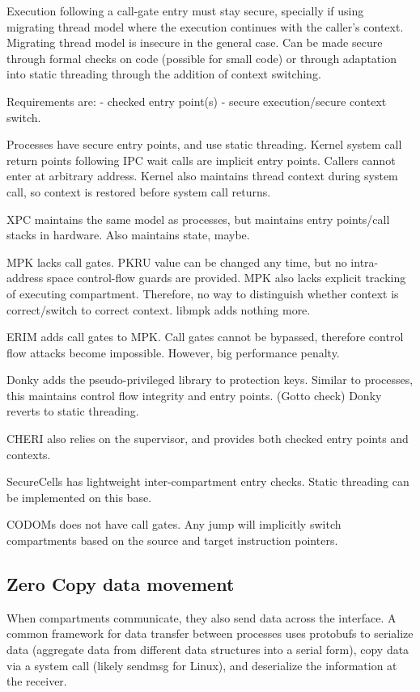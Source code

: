 Execution following a call-gate entry must stay secure, specially if using
migrating thread model where the execution continues with the caller's 
context.
Migrating thread model is insecure in the general case. 
Can be made secure through formal checks on code (possible for small code)
or through adaptation into static threading through the addition of context
switching.

Requirements are:
- checked entry point(s)
- secure execution/secure context switch.

Processes have secure entry points, and use static threading.
Kernel system call return points following IPC wait calls are implicit
entry points. 
Callers cannot enter at arbitrary address.
Kernel also maintains thread context during system call, so context is
restored before system call returns.

XPC maintains the same model as processes, but maintains entry points/call
stacks in hardware.
Also maintains state, maybe.

MPK lacks call gates. 
PKRU value can be changed any time, but no intra-address space control-flow
guards are provided.
MPK also lacks explicit tracking of executing compartment.
Therefore, no way to distinguish whether context is correct/switch to correct
context.
libmpk adds nothing more.

ERIM adds call gates to MPK.
Call gates cannot be bypassed, therefore control flow attacks become impossible.
However, big performance penalty.

Donky adds the pseudo-privileged library to protection keys.
Similar to processes, this maintains control flow integrity and entry points.
(Gotto check) Donky reverts to static threading.

CHERI also relies on the supervisor, and provides both checked entry points
and contexts.

SecureCells has lightweight inter-compartment entry checks.
Static threading can be implemented on this base.

CODOMs does not have call gates. 
Any jump will implicitly switch compartments based on the source and target
instruction pointers.

\subsection{Zero Copy data movement}

When compartments communicate, they also send data across the interface.
A common framework for data transfer between processes uses protobufs
to serialize data (aggregate data from different data structures into
a serial form), copy data via a system call (likely sendmsg for Linux),
and deserialize the information at the receiver.

